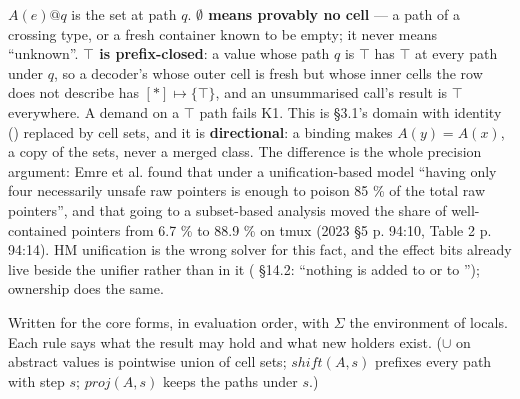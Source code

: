 $A(e)@q$ is the set at path $q$. \textbf{$\emptyset$ means provably no cell} — a path of a crossing type, or a fresh container known to be empty; it never means “unknown”. \textbf{$\top$ is prefix-closed}: a value whose path $q$ is $\top$ has $\top$ at every path under $q$, so a decoder's  whose outer cell is fresh but whose inner cells the row does not describe has $[\ast ]\mapsto \{\top \}$, and an unsummarised call's result is $\top$ everywhere. A demand on a $\top$ path fails K1. This is  §3.1's domain with identity () replaced by cell sets, and it is \textbf{directional}: a binding  makes $A(y)=A(x)$, a copy of the sets, never a merged class. The difference is the whole precision argument: Emre et al. found that under a unification-based model “having only four necessarily unsafe raw pointers is enough to poison 85 \% of the total raw pointers”, and that going to a subset-based analysis moved the share of well-contained pointers from 6.7 \% to 88.9 \% on tmux (2023 §5 p. 94:10, Table 2 p. 94:14). HM unification is the wrong solver for this fact, and the effect bits already live beside the unifier rather than in it ( §14.2: “nothing is added to  or to ”); ownership does the same.


Written for the core forms, in evaluation order, with $\Sigma$ the environment of locals. Each rule says what the result may hold and what new holders exist. ($\cup$ on abstract values is pointwise union of cell sets; $\mathit{shift}(A,\allowbreak{}s)$ prefixes every path with step $s$; $\mathit{proj}(A,\allowbreak{}s)$ keeps the paths under $s$.)

